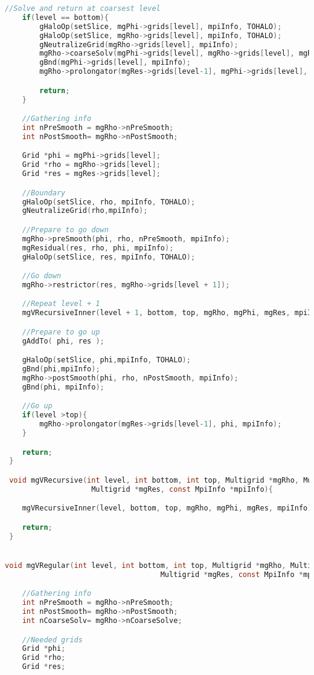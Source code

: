 \begin{lstlisting}[language=c, caption = main routine]
 	//Solve and return at coarsest level
 	if(level == bottom){
 		gHaloOp(setSlice, mgPhi->grids[level], mpiInfo, TOHALO);
		gHaloOp(setSlice, mgRho->grids[level], mpiInfo, TOHALO);
		gNeutralizeGrid(mgRho->grids[level], mpiInfo);
 		mgRho->coarseSolv(mgPhi->grids[level], mgRho->grids[level], mgRho->nCoarseSolve, mpiInfo);
		gBnd(mgPhi->grids[level], mpiInfo);
 		mgRho->prolongator(mgRes->grids[level-1], mgPhi->grids[level], mpiInfo);

 		return;
 	}

 	//Gathering info
 	int nPreSmooth = mgRho->nPreSmooth;
 	int nPostSmooth= mgRho->nPostSmooth;

 	Grid *phi = mgPhi->grids[level];
 	Grid *rho = mgRho->grids[level];
 	Grid *res = mgRes->grids[level];

 	//Boundary
 	gHaloOp(setSlice, rho, mpiInfo, TOHALO);
 	gNeutralizeGrid(rho,mpiInfo);

 	//Prepare to go down
 	mgRho->preSmooth(phi, rho, nPreSmooth, mpiInfo);
 	mgResidual(res, rho, phi, mpiInfo);
 	gHaloOp(setSlice, res, mpiInfo, TOHALO);

 	//Go down
 	mgRho->restrictor(res, mgRho->grids[level + 1]);

	//Repeat level + 1
 	mgVRecursiveInner(level + 1, bottom, top, mgRho, mgPhi, mgRes, mpiInfo);

 	//Prepare to go up
 	gAddTo( phi, res );

 	gHaloOp(setSlice, phi,mpiInfo, TOHALO);
 	gBnd(phi,mpiInfo);
 	mgRho->postSmooth(phi, rho, nPostSmooth, mpiInfo);
	gBnd(phi, mpiInfo);

 	//Go up
 	if(level >top){
		mgRho->prolongator(mgRes->grids[level-1], phi, mpiInfo);
 	}

 	return;
 }

 void mgVRecursive(int level, int bottom, int top, Multigrid *mgRho, Multigrid *mgPhi,
  					Multigrid *mgRes, const MpiInfo *mpiInfo){

 	mgVRecursiveInner(level, bottom, top, mgRho, mgPhi, mgRes, mpiInfo);

 	return;
 }


void mgVRegular(int level, int bottom, int top, Multigrid *mgRho, Multigrid *mgPhi,
 									Multigrid *mgRes, const MpiInfo *mpiInfo){

	//Gathering info
	int nPreSmooth = mgRho->nPreSmooth;
	int nPostSmooth= mgRho->nPostSmooth;
	int nCoarseSolv= mgRho->nCoarseSolve;

	//Needed grids
	Grid *phi;
	Grid *rho;
	Grid *res;


\end{lstlisting}
